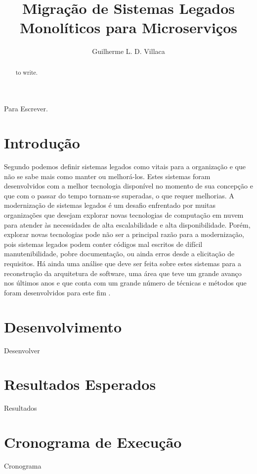 \documentclass[12pt]{article}
\title{Migração de Sistemas Legados Monolíticos para Microserviços}
\author{Guilherme L. D. Villaca\inst{1}}
\begin{document}
 

\maketitle

\begin{abstract}
  to write.
\end{abstract}
     
\begin{resumo} 
  Para Escrever.
\end{resumo}


\section{Introdução}

Segundo \cite{Bennett} podemos definir sistemas legados como vitais para a organização e que não se sabe mais como manter ou melhorá-los. Estes sistemas foram desenvolvidos com a melhor tecnologia disponível no momento de sua concepção e que com o passar do tempo tornam-se superadas, o que requer melhorias. A modernização de sistemas legados é um desafio enfrentado por muitas organizações que desejam explorar novas tecnologias de computação em nuvem para atender às necessidades de alta escalabilidade e alta disponibilidade\cite{Furda2018}. Porém, explorar novas tecnologias pode não ser a principal razão para a modernização, pois sistemas legados podem conter códigos mal escritos de difícil manutenibilidade, pobre documentação, ou ainda erros desde a elicitação de requisitos. Há ainda uma análise que deve ser feita sobre estes sistemas para a reconstrução da arquitetura de software, uma área que teve um grande avanço nos últimos anos e que conta com um grande número de técnicas e métodos que foram desenvolvidos para este fim \cite{OBrien2005}.



\section{Desenvolvimento} \label{sec:firstpage}

Desenvolver

\section{Resultados Esperados}

Resultados

\section{Cronograma de Execução}

Cronograma





\end{document}
